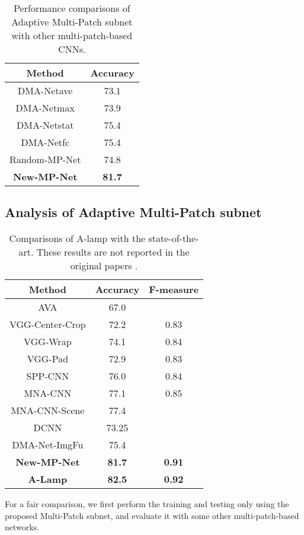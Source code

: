 \documentclass[10pt,twocolumn,letterpaper]{article}
\begin{document}
	\begin{table}
		\begin{center}	
			\begin{tabular}{||c|c||} 
				\hline
				Method & Accuracy \\
				\hline\hline
				DMA-Net{\tiny ave} & 73.1  \\
				DMA-Net{\tiny max} & 73.9  \\
				DMA-Net{\tiny stat} & 75.4 \\
				DMA-Net{\tiny fc} & 75.4 \\
				\hline
				Random-MP-Net & 74.8 \\
				\textbf{New-MP-Net} & \textbf{81.7}\\
				\hline
			\end{tabular} 
		\end{center} 
		\caption{Performance comparisons of Adaptive Multi-Patch subnet with other multi-patch-based CNNs.}
		\label{tabel1} 
		\vspace{-3mm}
	\end{table}
	
\subsection{Analysis of Adaptive Multi-Patch subnet}
\begin{table}
		\begin{center}
			\begin{tabular}{||c|c|c||} 
				\hline
				Method & Accuracy & F-measure\\
				\hline\hline
				AVA & 67.0  &   \\
				VGG-Center-Crop & 72.2  & 0.83 \\
				VGG-Wrap & 74.1  & 0.84 \\
				VGG-Pad & 72.9  & 0.83 \\
				\hline
				SPP-CNN & 76.0  & 0.84 \\
				MNA-CNN & 77.1  & 0.85 \\
				MNA-CNN-Scene & 77.4  &  \\
DCNN & 73.25  &  \\
				DMA-Net-ImgFu & 75.4  & \\
				\hline\hline
				\textbf{New-MP-Net} & \textbf{81.7} & \textbf{0.91} \\
				\textbf{A-Lamp} & \textbf{82.5 } & \textbf{0.92} \\
				\hline
			\end{tabular} 
		\end{center}
		\caption{Comparisons of A-lamp with the state-of-the-art.  These results are not reported in the original papers \cite{Lu:2015:ICCV,Lu:2014:TMM:rating,Mai:2016:CVPR,Murray:MMP2012:AVA}.}
		\label{tabel2}
		\vspace{-3mm}
	\end{table} 
For a fair comparison, we first perform the training and testing only using the proposed Multi-Patch subnet, and evaluate it with some other multi-patch-based networks. 
	
\end{document}
